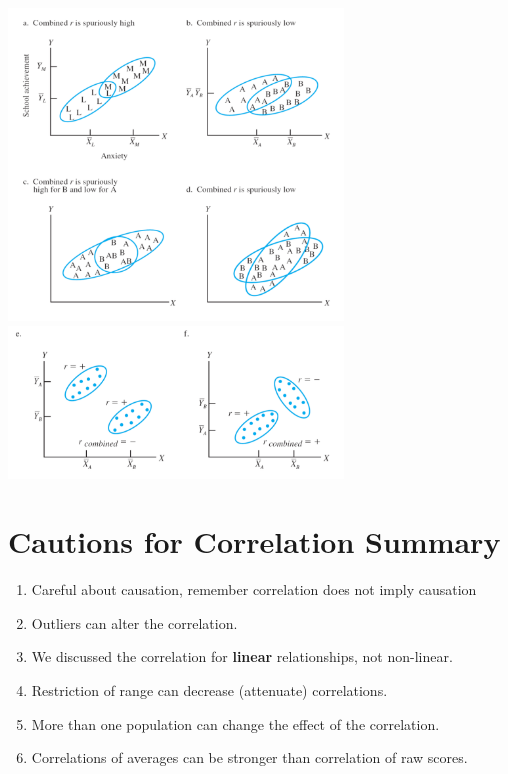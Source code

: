 \documentclass[12pt]{article}
\begin{document}
\includegraphics[width=3.5in]{corr_subpop.png} \includegraphics[width=3.5in]{corr_subpop2.png}

\section{Cautions for Correlation
Summary}\label{cautions-for-correlation-summary}

\begin{enumerate}
\def\labelenumi{\arabic{enumi}.}
\itemsep1pt\parskip0pt
\item
  Careful about causation, remember correlation does not imply causation
\item
  Outliers can alter the correlation.
\item
  We discussed the correlation for \textbf{linear} relationships, not
  non-linear.
\item
  Restriction of range can decrease (attenuate) correlations.
\item
  More than one population can change the effect of the correlation.
\item
  Correlations of averages can be stronger than correlation of raw
  scores.
\end{enumerate}
\end{document}
